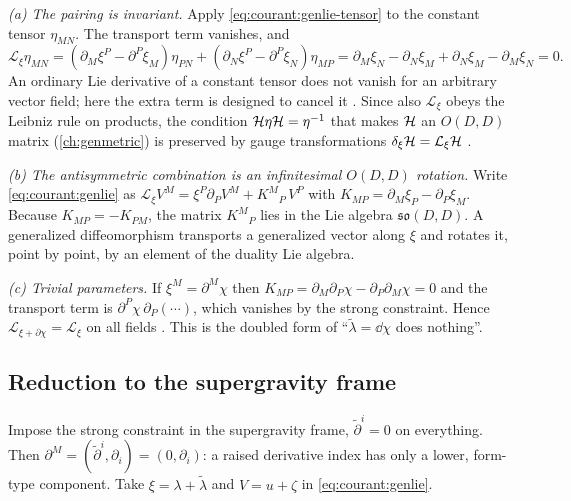 \emph{(a) The pairing is invariant.} Apply \eqref{eq:courant:genlie-tensor} to the constant
tensor $\eta_{MN}$. The transport term vanishes, and
\[
\mathcal L_\xi\eta_{MN}=(\partial_M\xi^P-\partial^P\xi_M)\eta_{PN}+(\partial_N\xi^P-\partial^P\xi_N)\eta_{MP}
=\partial_M\xi_N-\partial_N\xi_M+\partial_N\xi_M-\partial_M\xi_N=0 .
\]
An ordinary Lie derivative of a constant tensor does not vanish for an arbitrary vector field;
here the extra term is designed to cancel it . Since also $\mathcal L_\xi$ obeys the
Leibniz rule on products, the condition $\mathcal{H}\eta\mathcal{H}=\eta^{-1}$ that makes $\mathcal{H}$ an $O(D,D)$ matrix
(\cref{ch:genmetric}) is preserved by gauge transformations $\delta_\xi\mathcal{H}=\mathcal L_\xi\mathcal{H}$
.

\emph{(b) The antisymmetric combination is an infinitesimal $O(D,D)$ rotation.} Write
\eqref{eq:courant:genlie} as $\mathcal L_\xi V^M=\xi^P\partial_PV^M+K^M{}_P\,V^P$ with
$K_{MP}=\partial_M\xi_P-\partial_P\xi_M$. Because $K_{MP}=-K_{PM}$, the matrix $K^M{}_P$ lies in
the Lie algebra $\mathfrak{so}(D,D)$. A generalized diffeomorphism transports a generalized vector
along $\xi$ and rotates it, point by point, by an element of the duality Lie algebra.

\emph{(c) Trivial parameters.} If $\xi^M=\partial^M\chi$ then
$K_{MP}=\partial_M\partial_P\chi-\partial_P\partial_M\chi=0$ and the transport term is
$\partial^P\chi\,\partial_P(\cdots)$, which vanishes by the strong constraint. Hence
$\mathcal L_{\xi+\partial\chi}=\mathcal L_\xi$ on all fields . This is the doubled form of ``$\tilde\lambda=\dd\chi$ does nothing''.

\subsection{Reduction to the supergravity frame}

Impose the strong constraint in the supergravity frame, $\tilde\partial^i=0$ on everything. Then
$\partial^M=(\tilde\partial^i,\partial_i)=(0,\partial_i)$: a raised derivative index has only a
lower, form-type component. Take $\xi=\lambda+\tilde\lambda$ and $V=u+\zeta$ in
\eqref{eq:courant:genlie}.


